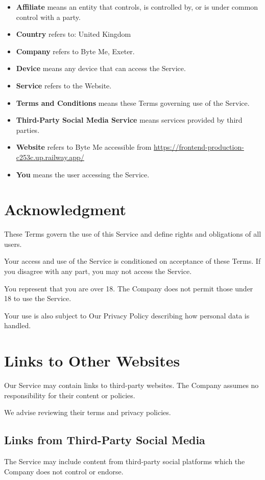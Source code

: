 \documentclass[11pt, a4paper]{report}
\begin{document}
\begin{itemize}
\begin{itemize}
	\item \textbf{Affiliate} means an entity that controls, is controlled by, or is under common control with a party.
	\item \textbf{Country} refers to: United Kingdom
	\item \textbf{Company} refers to Byte Me, Exeter.
	\item \textbf{Device} means any device that can access the Service.
	\item \textbf{Service} refers to the Website.
	\item \textbf{Terms and Conditions} means these Terms governing use of the Service.
	\item \textbf{Third-Party Social Media Service} means services provided by third parties.
	\item \textbf{Website} refers to Byte Me accessible from \url{https://frontend-production-c253c.up.railway.app/}
	\item \textbf{You} means the user accessing the Service.
\end{itemize}

\section*{Acknowledgment}
These Terms govern the use of this Service and define rights and obligations of all users.

Your access and use of the Service is conditioned on acceptance of these Terms. If you disagree with any part, you may not access the Service.

You represent that you are over 18. The Company does not permit those under 18 to use the Service.

Your use is also subject to Our Privacy Policy describing how personal data is handled.

\section*{Links to Other Websites}
Our Service may contain links to third-party websites. The Company assumes no responsibility for their content or policies.

We advise reviewing their terms and privacy policies.

\subsection*{Links from Third-Party Social Media}
The Service may include content from third-party social platforms which the Company does not control or endorse.


\end{itemize}
\end{document}
